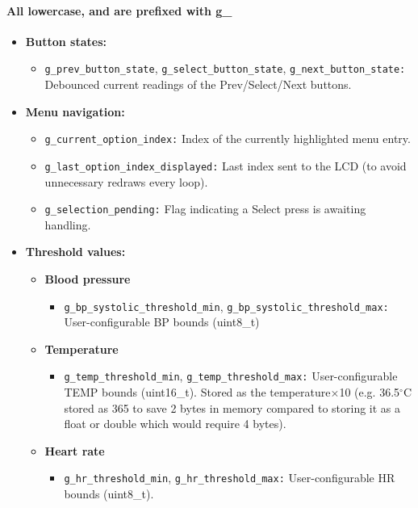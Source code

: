 \paragraph{All lowercase, and are prefixed with \textbf{g\_}}
\begin{itemize}
	\item \textbf{Button states:}
	\begin{itemize}
		\item \lstinline|g_prev_button_state|, \lstinline|g_select_button_state|, \lstinline|g_next_button_state:| Debounced current readings of the Prev/Select/Next buttons.
	\end{itemize}

	\item \textbf{Menu navigation:}
	\begin{itemize}
		\item \lstinline|g_current_option_index:| Index of the currently highlighted menu entry.
		\item \lstinline|g_last_option_index_displayed:| Last index sent to the LCD (to avoid unnecessary redraws every loop).
		\item \lstinline|g_selection_pending:| Flag indicating a Select press is awaiting handling.
	\end{itemize}

	\item \textbf{Threshold values:}
	\begin{itemize}
		\item \textbf{Blood pressure}
		\begin{itemize}
			\item \lstinline|g_bp_systolic_threshold_min|, \lstinline|g_bp_systolic_threshold_max:| User-configurable BP bounds (uint8\_t)
		\end{itemize}
		\item \textbf{Temperature}
		\begin{itemize}
			\item \lstinline|g_temp_threshold_min|, \lstinline|g_temp_threshold_max:| User-configurable TEMP bounds (uint16\_t). Stored as the temperature$\times$10 (e.g. 36.5$^\circ$C stored as 365 to save 2 bytes in memory compared to storing it as a float or double which would require 4 bytes).
		\end{itemize}
		\item \textbf{Heart rate}
		\begin{itemize}
			\item \lstinline|g_hr_threshold_min|, \lstinline|g_hr_threshold_max:| User-configurable HR bounds (uint8\_t).
		\end{itemize}
	\end{itemize}


\end{itemize}
